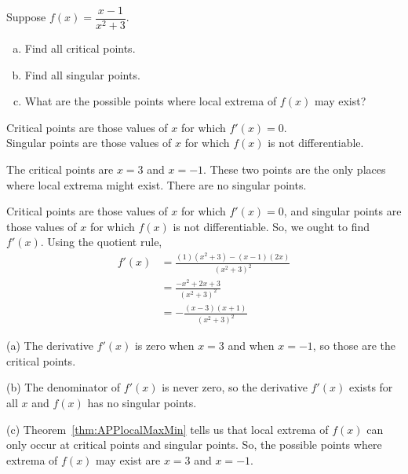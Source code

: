 \begin{Mquestion}
Suppose $f(x)=\dfrac{x-1}{x^2+3}$.
\begin{enumerate}[(a)]
\item Find all critical points.
\item Find all singular points.
\item What are the possible points where local extrema of $f(x)$ may exist?
\end{enumerate}
\end{Mquestion}
\begin{hint}
Critical points are those values of $x$ for which $f'(x)=0$.
\\
Singular points are those values of $x$ for which $f(x)$ is not differentiable.
\end{hint}
\begin{answer}
The critical points are $x=3$ and $x=-1$.
These two points are the only places where local extrema might exist.
There are no singular points.
\end{answer}
\begin{solution}
Critical points are those values of $x$ for which $f'(x)=0$, and
singular points are those values of $x$ for which $f(x)$ is not differentiable.
So, we ought to find $f'(x)$.
Using the quotient rule,
\begin{align*}
f'(x)&=\frac{(1)(x^2+3)-(x-1)(2x)}{{(x^2+3)}^2}\\
&=\frac{-x^2+2x+3}{{(x^2+3)}^2} \\
&=-\frac{(x-3)(x+1)}{{(x^2+3)}^2}
\end{align*}

(a) The derivative $f'(x)$ is zero when $x=3$ and when $x=-1$, so those are the critical points.

(b) The denominator of $f'(x)$ is never zero, so the derivative $f'(x)$ exists for all $x$ and $f(x)$ has no singular points.


(c) Theorem~\ref*{thm:APPlocalMaxMin} tells us that local extrema of $f(x)$ can only occur at critical points and singular points.
So, the possible points where extrema of $f(x)$ may exist are $x=3$ and $x=-1$.
\end{solution}



